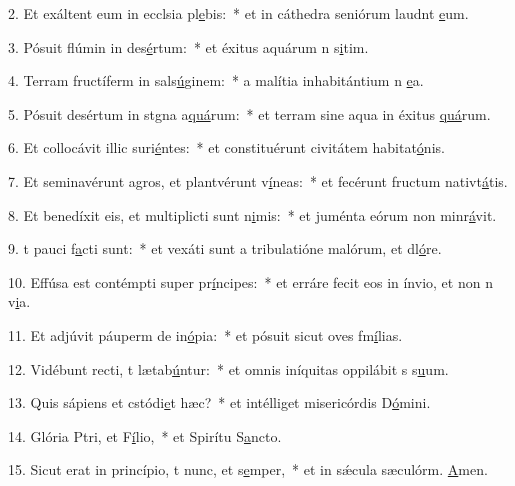 2. Et exáltent eum in ecclsia pl\uline{e}bis:~* et in cáthedra seniórum laudnt \uline{e}um.\par 
3. Pósuit flúmin in des\uline{é}rtum:~* et éxitus aquárum n s\uline{i}tim.\par 
4. Terram fructíferm in sals\uline{ú}ginem:~* a malítia inhabitántium n \uline{e}a.\par 
5. Pósuit desértum in stgna a\uline{quá}rum:~* et terram sine aqua in éxitus \uline{quá}rum.\par 
6. Et collocávit illic suri\uline{é}ntes:~* et constituérunt civitátem habitat\uline{ó}nis.\par 
7. Et seminavérunt agros, et plantvérunt v\uline{í}neas:~* et fecérunt fructum nativt\uline{á}tis.\par 
8. Et benedíxit eis, et multiplicti sunt n\uline{i}mis:~* et juménta eórum non minr\uline{á}vit.\par 
9. t pauci f\uline{a}cti sunt:~* et vexáti sunt a tribulatióne malórum, et dl\uline{ó}re.\par 
10. Effúsa est contémpti super pr\uline{í}ncipes:~* et erráre fecit eos in ínvio, et non n v\uline{i}a.\par 
11. Et adjúvit páuperm de in\uline{ó}pia:~* et pósuit sicut oves fm\uline{í}lias.\par 
12. Vidébunt recti, t lætab\uline{ú}ntur:~* et omnis iníquitas oppilábit s s\uline{u}um.\par 
13. Quis sápiens et cstódi\uline{e}t hæc?~* et intélliget misericórdis D\uline{ó}mini.\par 
14. Glória Ptri, et F\uline{í}lio,~* et Spirítu S\uline{a}ncto.\par 
15. Sicut erat in princípio, t nunc, et s\uline{e}mper,~* et in sǽcula sæculórm. \uline{A}men.\par 
